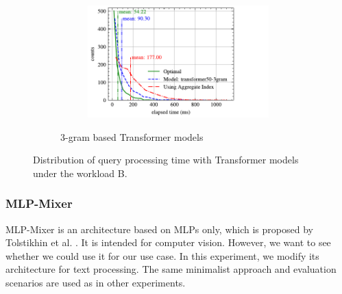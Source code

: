 \begin{figure}[p]
\begin{subfigure}{0.45\textwidth}
\begin{subfigure}{\textwidth}
		\end{subfigure}
		\vfill
		\begin{subfigure}{\textwidth}
			\centering
			\includegraphics[]{my/graphics/perf_dist_transformer50_3gram_B.pdf}
		\end{subfigure}
		\caption{3-gram based Transformer models}
	\end{subfigure}
	\caption{Distribution of query processing time with Transformer models under the workload B.}
	\label{fig:transformer_perf_all_B}
\end{figure}

\subsubsection{MLP-Mixer}
\label{subsection:expt_mlpmixer}


MLP-Mixer is an architecture based on MLPs only, which is proposed by Tolstikhin et al. \cite{DBLP:journals/corr/abs-2105-01601}. It is intended for computer vision. However, we want to see whether we could use it for our use case. In this experiment, we modify its architecture for text processing. The same minimalist approach and evaluation scenarios are used as in other experiments.


